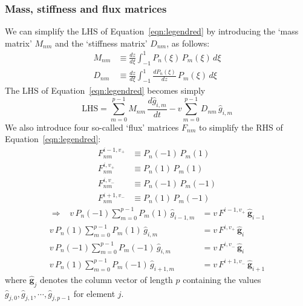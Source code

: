 \documentclass[10pt,a4paper]{article}
\begin{document}
\subsubsection{Mass, stiffness and flux matrices}

We can simplify the LHS of Equation~\ref{eqn:legendred} by introducing the `mass
matrix' $M_{nm}$ and the `stiffness matrix' $D_{nm}$, as follows:
\begin{align*}
M_{nm} & \equiv \frac{dz}{d\xi} \int_{-1}^{1} P_n(\xi) \, P_m(\xi) \, d\xi \\
D_{nm} & \equiv \frac{dz}{d\xi} \int_{-1}^{1} \frac{dP_n(\xi)}{dz} \, P_m(\xi) \, d\xi
\end{align*}
The LHS of Equation~\ref{eqn:legendred} becomes simply
\[
\mbox{LHS} = \sum_{m=0}^{p-1} M_{nm} \, \frac{d\hat{g}_{i,m}}{dt} - v \sum_{m=0}^{p-1}
D_{nm} \, \hat{g}_{i,m}
\]
We also introduce four so-called `flux' matrices $F_{nm}$ to simplify the RHS
of Equation~\ref{eqn:legendred}:
\begin{align*}
F_{nm}^{i-1,v_+} & \equiv P_n(-1) \, P_m(1) \\
F_{nm}^{i,v_+} & \equiv P_n(1) \, P_m(1) \\
F_{nm}^{i,v_-} & \equiv P_n(-1) \, P_m(-1) \\
F_{nm}^{i+1,v_-} & \equiv P_n(1) \, P_m(-1)
\end{align*}
\begin{align*}
\Longrightarrow \;\;\;
v \, P_n(-1) \sum_{m=0}^{p-1} P_m(1) \, \hat{g}_{i-1,m} & = v \, F^{i-1,v_+} \,
\hat{\mathbf{g}}_{i-1} \\
v \, P_n(1) \sum_{m=0}^{p-1} P_m(1) \, \hat{g}_{i,m} & = v \, F^{i,v_+} \,
\hat{\mathbf{g}}_{i} \\
v \, P_n(-1) \sum_{m=0}^{p-1} P_m(-1) \, \hat{g}_{i,m} & = v \, F^{i,v_-} \,
\hat{\mathbf{g}}_{i} \\
v \, P_n(1) \sum_{m=0}^{p-1} P_m(-1) \, \hat{g}_{i+1,m} & = v \, F^{i+1,v_-} \,
\hat{\mathbf{g}}_{i+1}
\end{align*}
where $\hat{\mathbf{g}}_j$ denotes the column vector of length $p$ containing
the values $\hat{g}_{j,0}, \hat{g}_{j,1}, \cdots, \hat{g}_{j,p-1}$ for element $j$.
\end{document}
